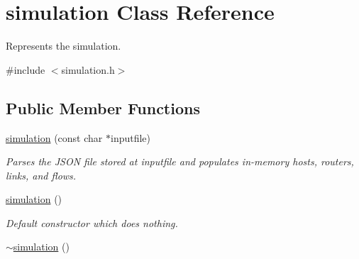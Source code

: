 \hypertarget{classsimulation}{\section{simulation Class Reference}
\label{classsimulation}
}


Represents the simulation.  




{\ttfamily \#include $<$simulation.\-h$>$}

\subsection*{Public Member Functions}
\begin{DoxyCompactItemize}
\item 
\hyperlink{classsimulation_a4d5d5e617072409f1e5161ab048417df}{simulation} (const char $\ast$inputfile)
\begin{DoxyCompactList}\small\item\em Parses the J\-S\-O\-N file stored at {\ttfamily inputfile} and populates in-\/memory hosts, routers, links, and flows. \end{DoxyCompactList}\item 
\hyperlink{classsimulation_ae87d935230f2887512bbea182b0b5cda}{simulation} ()
\begin{DoxyCompactList}\small\item\em Default constructor which does nothing. \end{DoxyCompactList}\item 
\hypertarget{classsimulation_ac84df84c712163d5378db4b4fe62bc98}{\hyperlink{classsimulation_ac84df84c712163d5378db4b4fe62bc98}{$\sim$simulation} ()}\label{classsimulation_ac84df84c712163d5378db4b4fe62bc98}


\end{DoxyCompactItemize}
